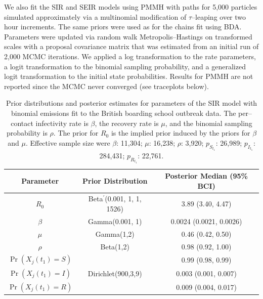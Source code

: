 We also fit the SIR and SEIR models using PMMH with paths for 5,000 particles simulated approximately via a multinomial modification of $ \tau $--leaping over two hour increments. The same priors were used as for the chains fit using BDA. Parameters were updated via random walk Metropolis--Hastings on transformed scales with a proposal covariance matrix that was estimated from an initial run of 2,000 MCMC iterations. We applied a log transformation to the rate parameters, a logit transformation to the binomial sampling probability, and a generalized logit transformation to the initial state probabilities. Results for PMMH are not reported since the MCMC never converged (see traceplots below).

\begin{table}[htbp]
	\begin{center}
		\begin{tabular}{ccc}
			\hline Parameter &  Prior Distribution & Posterior Median (95\% BCI)  \\ 
			\hline
			\hline $R_0$ & Beta$ ^\prime $(0.001, 1, 1, 1526) & 3.89 (3.40, 4.47) \\
			\hline $\beta$ & Gamma(0.001, 1) & 0.0024 (0.0021, 0.0026) \\ 
			\hline $\mu$ & Gamma(1,2) & 0.46 (0.42, 0.50) \\ 
			\hline $\rho $ & Beta(1,2) & 0.98 (0.92, 1.00)\\
			\hline $\Pr(X_j(t_1) = S)$& \multirow{3}{*}{Dirichlet(900,3,9)} & 0.99 (0.98, 0.99) \\
			$\Pr(X_j(t_1) = I)$& & 0.003 (0.001, 0.007) \\
			$\Pr(X_j(t_1) = R)$&  & 0.009 (0.004, 0.017)\\
			\hline 
		\end{tabular} 
		\caption{Prior distributions and posterior estimates for parameters of the SIR model with binomial emissions fit to the British boarding school outbreak data. The per--contact infectivity rate is $ \beta $, the recovery rate is $ \mu $, and the binomial sampling probability is $ \rho $. The prior for $ R_0 $ is the implied prior induced by the priors for $ \beta $ and $ \mu $. Effective sample size were $\beta$: 11,304; $\mu$: 16,238; $\rho$: 3,920; $p_{S_{t_1}}$: 26,989; $p_{I_{t_1}}$: 284,431; $p_{R_{t_1}}$: 22,761.}
		\label{tab:bbs_SIR_prior_binom}
	\end{center}
\end{table}

